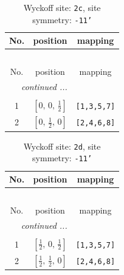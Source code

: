 \documentclass[fleqn,8pt]{jsarticle}
\begin{document}
\renewcommand{\arraystretch}{1.2}
\begin{longtable}{ccc}
\caption{Wyckoff site: {\tt 2c}, site symmetry: {\tt -11'}}
 \\
 \hline \hline
No. & position & mapping \\ \hline \endfirsthead

\multicolumn{2}{l}{\tablename\ \thetable{}} \\
 \hline \hline
No. & position & mapping \\ \hline \endhead

 \hline \hline
\multicolumn{2}{r}{\footnotesize\it continued ...} \\ \endfoot

 \hline \hline
\multicolumn{2}{r}{} \\ \endlastfoot

1 & $\left[ 0,\, 0,\, \frac{1}{2} \right]$ & {\tt [1,3,5,7]} \\ \hline
2 & $\left[ 0,\, \frac{1}{2},\, 0 \right]$ & {\tt [2,4,6,8]} \\
\end{longtable}
\renewcommand{\arraystretch}{1.2}
\begin{longtable}{ccc}
\caption{Wyckoff site: {\tt 2d}, site symmetry: {\tt -11'}}
 \\
 \hline \hline
No. & position & mapping \\ \hline \endfirsthead

\multicolumn{2}{l}{\tablename\ \thetable{}} \\
 \hline \hline
No. & position & mapping \\ \hline \endhead

 \hline \hline
\multicolumn{2}{r}{\footnotesize\it continued ...} \\ \endfoot

 \hline \hline
\multicolumn{2}{r}{} \\ \endlastfoot

1 & $\left[ \frac{1}{2},\, 0,\, \frac{1}{2} \right]$ & {\tt [1,3,5,7]} \\ \hline
2 & $\left[ \frac{1}{2},\, \frac{1}{2},\, 0 \right]$ & {\tt [2,4,6,8]} \\
\end{longtable}
\renewcommand{\arraystretch}{1.2}
\end{document}
